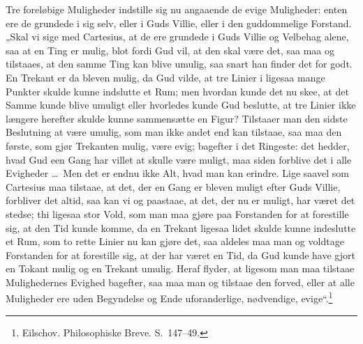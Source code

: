 \documentclass[12pt]{book}
\newcommand{\opage}[1]{\marginnote{\footnotesize\textit{[#1]}}}
\begin{document}
Tre foreløbige Muligheder indstille sig nu angaaende de evige Muligheder: enten ere de grundede i sig selv, eller i Guds Villie, eller i den guddommelige Forstand. „Skal vi sige med Cartesius, at de ere grundede i Guds Villie og Velbehag alene, saa at en Ting er mulig, blot fordi Gud vil, at den skal være det, saa maa og tilstaaes, at den samme Ting kan blive umulig, saa snart han finder det for godt. En Trekant er da bleven mulig, da Gud vilde, at tre Linier i ligesaa mange Punkter skulde kunne indslutte et Rum; men hvordan kunde det nu skee, at det Samme kunde blive umuligt eller hvorledes kunde Gud beslutte, at tre Linier ikke længere herefter skulde kunne sammensætte en Figur? Tilstaaer man den sidste Beslutning at være umulig, som man ikke andet end kan tilstaae, saa maa den første, som gjør Trekanten mulig, være evig; bagefter i det Ringeste: det hedder, hvad Gud een Gang har villet at skulle være muligt, maa siden forblive det i alle Evigheder \dots\ Men det er endnu ikke Alt, hvad man kan erindre. Lige saavel som Cartesius maa tilstaae, at det, der en Gang er bleven muligt efter Guds Villie, forbliver det altid, saa kan vi og paastaae, at det, der nu er muligt, har været det stedse; thi ligesaa stor Vold, som man maa gjøre paa Forstanden for at forestille sig, at den Tid kunde komme, da en Trekant ligesaa lidet skulde kunne indeslutte et Rum,
\opage{227}som to rette Linier nu kan gjøre det, saa aldeles maa man og voldtage Forstanden for at forestille sig, at der har været en Tid, da Gud kunde have gjort en Tokant mulig og en Trekant umulig. Heraf flyder, at ligesom man maa tilstaae Mulighedernes Evighed bagefter, saa maa man og tilstaae den forved, eller at alle Muligheder ere uden Begyndelse og Ende uforanderlige, nødvendige, evige“.\footnote{Eilschov. Philosophiske Breve. S.~147--49.}%
\end{document}
